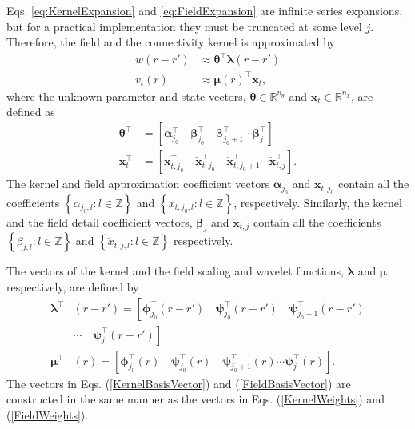 \documentclass[journal,a4paper]{IEEEtran}
\begin{document}
Eqs. \eqref{eq:KernelExpansion} and \eqref{eq:FieldExpansion} are infinite series expansions, but  for a practical implementation they must be truncated at some level $j$. Therefore, the field and the connectivity kernel is approximated by
 \begin{align}
 w\left(r-r'\right) &\approx \boldsymbol\theta^\top\boldsymbol\lambda\left(r-r'\right) 
\label{eq:KernelFiniteExpansion} \\
 v_t\left(r\right) &\approx \boldsymbol\mu\left(r\right)^\top\mathbf{x}_t,
\label{eq:FieldFiniteExpansion}
\end{align}
where the unknown parameter and state vectors, $\boldsymbol\theta \in \mathbb{R}^{n_{\theta}}$ and $\mathbf{x}_t \in \mathbb{R}^{n_x}$, are defined as 
\begin{align}
 \boldsymbol\theta^\top &=\left[ \boldsymbol\alpha_{j_0}^\top \quad \boldsymbol\beta_{j_0}^\top \quad \boldsymbol\beta_{j_0+1}^\top \cdots \boldsymbol\beta_{j}^\top\right] 
\label{KernelWeights} \\
 \mathbf{x}_{t}^\top &=\left[\mathbf{x}_{t,j_{0}}^\top \quad  \check{\mathbf{x}}_{t,j_{0}}^\top \quad  \check{\mathbf{x}}_{t,j_{0}+1}^\top \cdots \check{\mathbf{x}}_{t,j}^\top\right].
\label{FieldWeights}
\end{align}
The kernel and field approximation coefficient vectors $\boldsymbol \alpha_{j_0}$ and $\mathbf{x}_{t,j_{0}}$ contain all the coefficients $\left\lbrace\alpha_{j_0, l}:l \in \mathbb{Z} \right\rbrace $ and $\left\lbrace x_{t,j_0, l}: l \in \mathbb{Z}\right\rbrace$, respectively. Similarly, the kernel and the field detail coefficient vectors, $\boldsymbol\beta_{j}$ and $\check{\mathbf{x}}_{t,j}$ contain all the coefficients $\left\lbrace \beta_{j,l} :l \in \mathbb{Z}\right\rbrace$ and $\left\lbrace  \check x_{t,j, l}:l \in \mathbb{Z}\right\rbrace$ respectively.

The vectors of the kernel and the field scaling and wavelet functions, $\boldsymbol\lambda$ and $\boldsymbol\mu$ respectively, are defined by
\begin{align}
 \boldsymbol\lambda^\top & (r-r')=\left[ \boldsymbol\phi_{j_0}^\top(r-r') \quad \boldsymbol\psi_{j_0}^\top(r-r') \quad \boldsymbol\psi_{j_0+1}^\top(r-r') \right. \nonumber \\
&\left. \cdots \quad \boldsymbol\psi_{j}^\top(r-r')\right] \label{KernelBasisVector} \\
 \boldsymbol\mu^\top & (r)=\left[ \boldsymbol\phi_{j_0}^\top(r) \quad \boldsymbol\psi_{j_0}^\top(r) \quad \boldsymbol\psi_{j_0+1}^\top(r) \cdots \boldsymbol\psi_{j}^\top(r) \right]. 
\label{FieldBasisVector}
\end{align}
The vectors in Eqs. (\ref{KernelBasisVector}) and (\ref{FieldBasisVector}) are constructed in the same manner as the vectors in Eqs. (\ref{KernelWeights}) and (\ref{FieldWeights}). 
\end{document}
